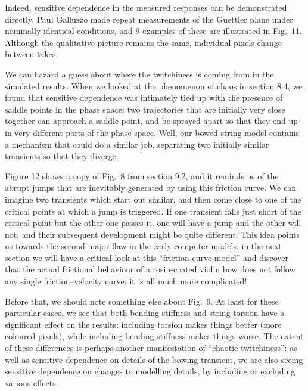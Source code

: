   Indeed, sensitive dependence in the measured responses can be demonstrated 
  directly. Paul Galluzzo made repeat measurements of the Guettler plane under 
  nominally identical conditions, and 9 examples of these are illustrated in 
  Fig.\ 11. Although the qualitative picture remains the same, individual 
  pixels change between takes. 


  We can hazard a guess about where the twitchiness is coming from in the 
  simulated results. When we looked at the phenomenon of chaos in section 8.4, 
  we found that sensitive dependence was intimately tied up with the presence 
  of saddle points in the phase space: two trajectories that are initially very 
  close together can approach a saddle point, and be sprayed apart so that they 
  end up in very different parts of the phase space. Well, our bowed-string 
  model contains a mechanism that could do a similar job, separating two 
  initially similar transients so that they diverge. 

  Figure 12 shows a copy of Fig.\ 8 from section 9.2, and it reminds us of the 
  abrupt jumps that are inevitably generated by using this friction curve. We 
  can imagine two transients which start out similar, and then come close to 
  one of the critical points at which a jump is triggered. If one transient 
  falls just short of the critical point but the other one passes it, one will 
  have a jump and the other will not, and their subsequent development might be 
  quite different. This idea points us towards the second major flaw in the 
  early computer models: in the next section we will have a critical look at 
  this “friction curve model” and discover that the actual frictional behaviour 
  of a rosin-coated violin bow does not follow any single friction--velocity 
  curve: it is all much more complicated! 


  Before that, we should note something else about Fig.\ 9. At least for these 
  particular cases, we see that both bending stiffness and string torsion have 
  a significant effect on the results: including torsion makes things better 
  (more coloured pixels), while including bending stiffness makes things worse. 
  The extent of these differences is perhaps another manifestation of “chaotic 
  twitchiness”: as well as sensitive dependence on details of the bowing 
  transient, we are also seeing sensitive dependence on changes to modelling 
  details, by including or excluding various effects. 



